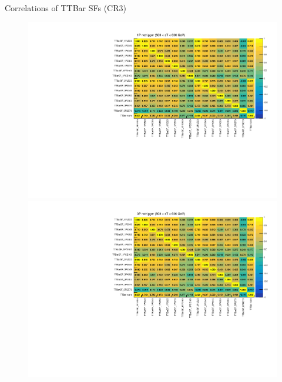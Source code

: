 \documentclass[aspectratio=46, dvipdfmx, 10pt, t]{beamer} %
\begin{document}
\begin{frame}{Correlations of TTBar SFs (CR3)}
  \vspace{15mm}
  \begin{figure}
    \setcounter{subfigure}{0}
    \centering
        \includegraphics[scale=0.29]{correlation_sf_1P_notrigger_CR3_stGE500LT600}
        \includegraphics[scale=0.29]{correlation_sf_3P_notrigger_CR3_stGE500LT600}
  \end{figure}
\end{frame}
\end{document}
